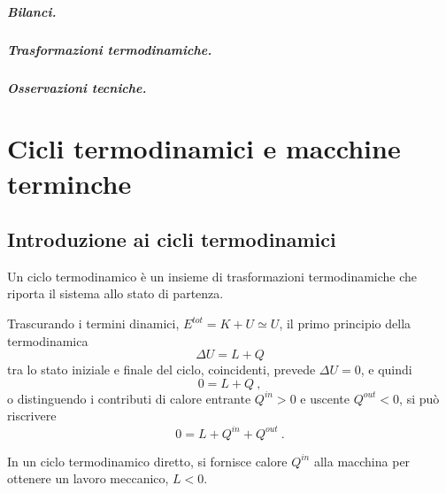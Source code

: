 \paragraph{Bilanci.}
\paragraph{Trasformazioni termodinamiche.}
\paragraph{Osservazioni tecniche.}

\chapter{Cicli termodinamici e macchine terminche}\label{thermodynamics:thermal_machines}
\section{Introduzione ai cicli termodinamici}
\begin{definition} Un ciclo termodinamico è un insieme di trasformazioni termodinamiche che riporta il sistema allo stato di partenza.
\end{definition}
Trascurando i termini dinamici, $E^{tot} = K + U \simeq U$, il primo principio della termodinamica
\begin{equation}
    \Delta U = L + Q
\end{equation}
tra lo stato iniziale e finale del ciclo, coincidenti, prevede $\Delta U = 0$, e quindi
\begin{equation}
    0 = L + Q \ ,
\end{equation}
o distinguendo i contributi di calore entrante $Q^{in} > 0$ e uscente $Q^{out} < 0$, si può riscrivere
\begin{equation}
    0 = L + Q^{in} + Q^{out} \ .
\end{equation}

\begin{definition} In un ciclo termodinamico diretto, si fornisce calore $Q^{in}$ alla macchina per ottenere un lavoro meccanico, $L<0$.
\end{definition}
\begin{example}
\end{example}
\begin{example}
\end{example}
\begin{example}
\end{example}

